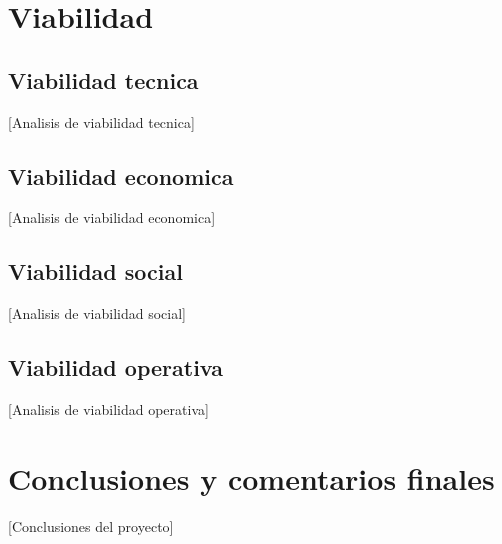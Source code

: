 \documentclass[12pt,a4paper]{article}
\begin{document}
\section{Viabilidad}

\subsection{Viabilidad tecnica}
[Analisis de viabilidad tecnica]

\subsection{Viabilidad economica}
[Analisis de viabilidad economica]

\subsection{Viabilidad social}
[Analisis de viabilidad social]

\subsection{Viabilidad operativa}
[Analisis de viabilidad operativa]

\section{Conclusiones y comentarios finales}
[Conclusiones del proyecto]



\end{document}
